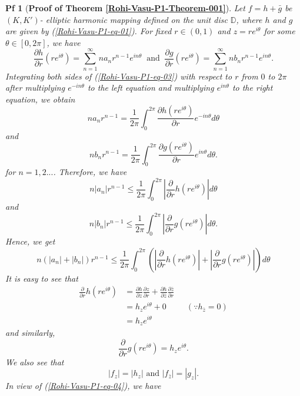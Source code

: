 \documentclass[10pt,a4paper]{amsart}
\newtheorem{pf}{Pf}
\begin{document}
\begin{pf} [{\bf Proof of Theorem   \ref{Rohi-Vasu-P1-Theorem-001}}]
Let $f=h+\bar{g}$ be $(K,K')$- elliptic harmonic mapping defined on the unit disc $\mathbb{D}$, where $h$ and $g$ are given by (\ref{Rohi-Vasu-P1-eq-01}). For fixed $r \in (0,1)$ and $z=r e^{i\theta}$ for some $\theta \in [0,2\pi]$, we have 
\begin{equation}\label{Rohi-Vasu-P1-eq-03}
\frac{\partial h}{\partial r}(r e^{i \theta})=\sum_{n=1}^{\infty} n a_n r^{n-1} e^{i n \theta} \ 
\text { and } \ \frac{\partial g}{\partial r}(r e^{i \theta})=\sum_{n=1}^{\infty} n b_n r^{n-1} e^{i n \theta}.
\end{equation}
Integrating both sides of (\ref{Rohi-Vasu-P1-eq-03}) with respect to $r$ from $ 0$ to $2\pi $ after multiplying $e^{-i n \theta}$ to the left equation and multiplying $e^{i n \theta}$ to the right equation, we obtain
$$
n a_n r^{n-1}=\frac{1}{2 \pi} \int_0^{2 \pi} \frac{\partial h( re^{i \theta}) }{\partial r} e^{-i n \theta} d \theta $$
and 
$$
n b_n r^{n-1}=\frac{1}{2 \pi} \int_0^{2 \pi} \frac{\partial g( re^{i \theta}) }{\partial r} e^{i n \theta} d \theta.  $$ 
for $n=1,2...$.
Therefore, we have
$$
 n\left|a_n\right| r^{n-1} \leq \frac{1}{2 \pi} \int_0^{2 \pi} \left| {\frac{\partial}{\partial r}}h(re^{i \theta}) \right|  d \theta  $$
 and 
 $$
  n\left|b_n\right| r^{n-1} \leq \frac{1}{2 \pi} \int_0^{2 \pi} \left| {\frac{\partial }{\partial r}}g(re^{i \theta}) \right|  d \theta.$$
  Hence, we get
  $$
 n\left(\left|a_n\right|+\left|b_n\right|\right) r^{n-1} \leq \frac{1}{2 \pi} \int_0^{2 \pi}\left(\left|\frac{\partial }{\partial r}h(re^{i \theta})\right|+\left|\frac{\partial}{\partial r} g(re^{i \theta})\right|\right) d \theta 
$$
It is easy to see that
$$
\begin{aligned}
\frac{\partial }{\partial r}h( re^{i \theta}) &=\frac{\partial h}{\partial z} \frac{\partial z}{\partial r}+\frac{\partial h}{\partial \bar{z}} \frac{\partial \bar{z}}{\partial r} \\
&=h_z e^{i \theta}+0 \quad \quad \ \  \left(\because h_{\bar{z}}=0\right)\\
&=h_z e^{i \theta}
\end{aligned}
$$
and similarly, $$
\frac{\partial}{\partial r} g( re^{i \theta})=h_z e^{i \theta}.
$$
We also see that
\begin{equation}\label{Rohi-Vasu-P1-eq-04}
\left|f_z\right|=\left|h_z\right| \text { and }\left|f_{\bar{z}}\right|=\left|g_z\right|.
\end{equation}
In view of (\ref{Rohi-Vasu-P1-eq-04}), we have


\end{pf}
\end{document}
